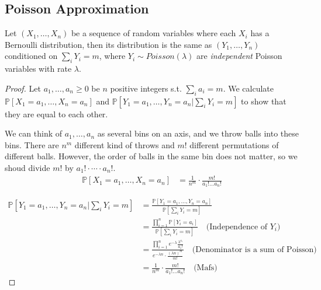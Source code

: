     \subsection{Poisson Approximation}
        \begin{theorem}\label{Thm:PoissonApproximation}
            Let $(X_1,\dots,X_n)$ be a sequence of random variables where each $X_i$ has a Bernoulli distribution, then its distribution is the same as $(Y_1, \dots, Y_n)$ conditioned on $\sum_i Y_i = m$, where $Y_i \sim Poisson(\lambda)$ are \emph{independent} Poisson variables with rate $\lambda$.
        \end{theorem}
        \begin{proof}
            Let $a_1, \dots, a_n \ge 0$ be $n$ positive integers s.t. $\sum_i a_i = m$. We calculate $\mathbb{P}[X_1 = a_1, \dots, X_n = a_n]$ and $\mathbb{P}[Y_1 = a_1, \dots, Y_n = a_n|\sum_i Y_i=m]$ to show that they are equal to each other.

            We can think of $a_1,\dots,a_n$ as several bins on an axis, and we throw balls into these bins. There are $n^m$ different kind of throws and $m!$ different permutations of different balls. However, the order of balls in the same bin does not matter, so we shoud divide $m!$ by $a_1!\cdot \cdots \cdot a_n!$.
            \begin{align*}
                \mathbb{P}[X_1 = a_1, \dots, X_n = a_n]
                &= \frac{1}{n^m} \cdot \frac{m!}{a_1! \dots a_n!}
            \end{align*}

            \begin{align*}
                \mathbb{P}[Y_1 = a_1, \dots, Y_n = a_n | \sum_iY_i = m]
                &= \frac{\mathbb{P}[Y_1=a_1,\dots,Y_n=a_n]}{\mathbb{P}[\sum_i Y_i = m]}\\
                &= \frac{\prod_{i=1}^n \mathbb{P}[Y_i = a_i]}{\mathbb{P}[\sum_i Y_i = m]} \quad \text{(Independence of $Y_i$)}\\
                &= \frac{\prod_{i=1}^n e^{-\lambda}\frac{\lambda^{a_i}}{a_i!}}{e^{-\lambda n} \cdot \frac{(\lambda n)^m}{m!}} \quad \text{(Denominator is a sum of Poisson)}\\
                &= \frac{1}{n^m} \cdot \frac{m!}{a_1! \dots a_n!} \quad \text{(Mafs)}
            \end{align*}

        \end{proof}

